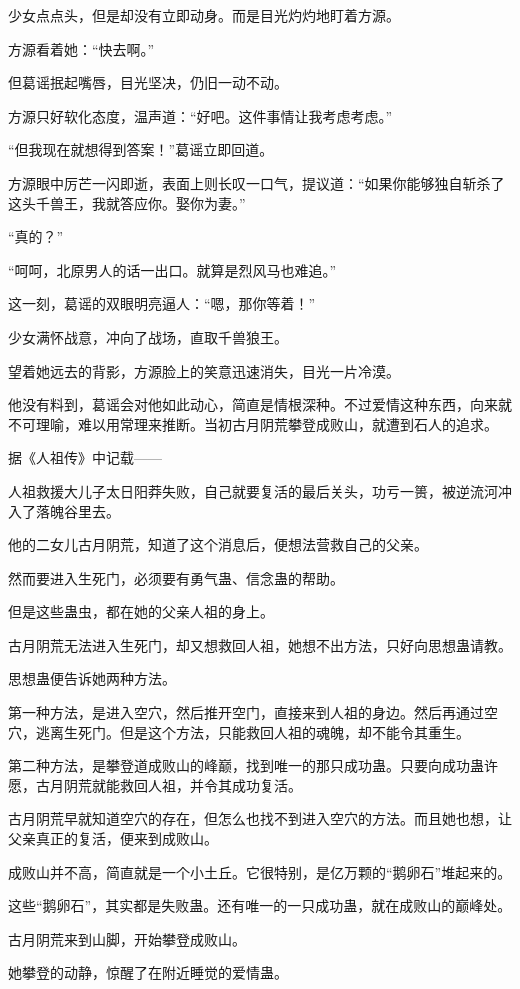 \begin{this_body}
少女点点头，但是却没有立即动身。而是目光灼灼地盯着方源。

方源看着她：“快去啊。”

但葛谣抿起嘴唇，目光坚决，仍旧一动不动。

方源只好软化态度，温声道：“好吧。这件事情让我考虑考虑。”

“但我现在就想得到答案！”葛谣立即回道。

方源眼中厉芒一闪即逝，表面上则长叹一口气，提议道：“如果你能够独自斩杀了这头千兽王，我就答应你。娶你为妻。”

“真的？”

“呵呵，北原男人的话一出口。就算是烈风马也难追。”

这一刻，葛谣的双眼明亮逼人：“嗯，那你等着！”

少女满怀战意，冲向了战场，直取千兽狼王。

望着她远去的背影，方源脸上的笑意迅速消失，目光一片冷漠。

他没有料到，葛谣会对他如此动心，简直是情根深种。不过爱情这种东西，向来就不可理喻，难以用常理来推断。当初古月阴荒攀登成败山，就遭到石人的追求。

据《人祖传》中记载——

人祖救援大儿子太日阳莽失败，自己就要复活的最后关头，功亏一篑，被逆流河冲入了落魄谷里去。

他的二女儿古月阴荒，知道了这个消息后，便想法营救自己的父亲。

然而要进入生死门，必须要有勇气蛊、信念蛊的帮助。

但是这些蛊虫，都在她的父亲人祖的身上。

古月阴荒无法进入生死门，却又想救回人祖，她想不出方法，只好向思想蛊请教。

思想蛊便告诉她两种方法。

第一种方法，是进入空穴，然后推开空门，直接来到人祖的身边。然后再通过空穴，逃离生死门。但是这个方法，只能救回人祖的魂魄，却不能令其重生。

第二种方法，是攀登道成败山的峰巅，找到唯一的那只成功蛊。只要向成功蛊许愿，古月阴荒就能救回人祖，并令其成功复活。

古月阴荒早就知道空穴的存在，但怎么也找不到进入空穴的方法。而且她也想，让父亲真正的复活，便来到成败山。

成败山并不高，简直就是一个小土丘。它很特别，是亿万颗的“鹅卵石”堆起来的。

这些“鹅卵石”，其实都是失败蛊。还有唯一的一只成功蛊，就在成败山的巅峰处。

古月阴荒来到山脚，开始攀登成败山。

她攀登的动静，惊醒了在附近睡觉的爱情蛊。


\end{this_body}
